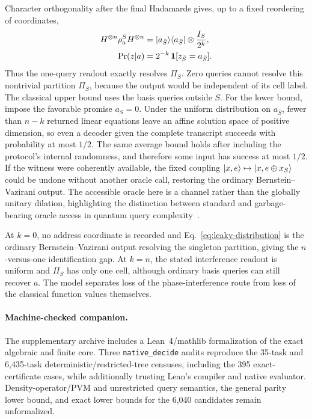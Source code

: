 \documentclass[
  aps,
  prl,
  reprint,
  nofootinbib
]{revtex4-2}
\begin{document}
Character orthogonality after the final Hadamards gives, up to a fixed
reordering of coordinates,
\begin{equation}
\begin{aligned}
 H^{\otimes n}\rho_a^S H^{\otimes n}
 &=\ket{a_{\bar S}}\!\bra{a_{\bar S}}\otimes\frac{I_S}{2^k},\\
 \Pr(z|a)&=2^{-k}\,\mathbf 1[z_{\bar S}=a_{\bar S}].
\end{aligned}
 \label{eq:leaky-distribution}
\end{equation}
Thus the one-query readout exactly resolves \(\Pi_S\). Zero queries cannot
resolve this nontrivial
partition \(\Pi_S\), because the output would be independent of its cell
label. The classical upper bound uses the basis queries outside \(S\). For the
lower bound, impose the favorable promise \(a_S=0\). Under the uniform
distribution on \(a_{\bar S}\), fewer than \(n-k\) returned linear equations
leave an affine solution space of positive dimension, so even a decoder given
the complete transcript succeeds with probability at most \(1/2\). The same
average bound holds after including the protocol's internal randomness, and
therefore some input has success at most \(1/2\). If the witness were
coherently available, the fixed coupling
\(\ket{x,e}\mapsto\ket{x,e\oplus x_S}\) could be undone without another
oracle call, restoring the ordinary Bernstein--Vazirani output. The
accessible oracle here is a channel rather than the globally unitary dilation,
highlighting the distinction between standard and garbage-bearing oracle
access in quantum query complexity~\cite{Aaronson2021OpenProblems}.

At \(k=0\), no address coordinate is recorded and
Eq.~\eqref{eq:leaky-distribution} is the ordinary Bernstein--Vazirani output
resolving the singleton partition, giving the \(n\)-versus-one
identification gap.
At \(k=n\), the stated interference readout is uniform and
\(\Pi_S\) has only one cell, although ordinary basis queries can still
recover \(a\). The model separates loss of the phase-interference route from
loss of the classical function values themselves.

\paragraph{Machine-checked companion.}
The supplementary archive includes a Lean~4/mathlib formalization of the
exact algebraic and finite core. Three \texttt{native\_decide} audits reproduce
the 35-task and 6,435-task deterministic/restricted-tree censuses, including
the 395 exact-certificate cases, while additionally trusting Lean's compiler
and native evaluator. Density-operator/PVM and unrestricted query semantics,
the general parity lower bound, and exact lower bounds for the 6,040 candidates
remain unformalized.
\end{document}
